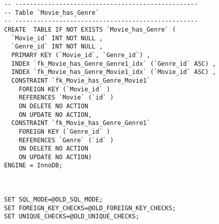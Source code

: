 \begin{lstlisting}[breaklines]
-- --------------------------------------------------
-- Table `Movie_has_Genre`
-- --------------------------------------------------
CREATE  TABLE IF NOT EXISTS `Movie_has_Genre` (
  `Movie_id` INT NOT NULL ,
  `Genre_id` INT NOT NULL ,
  PRIMARY KEY (`Movie_id`, `Genre_id`) ,
  INDEX `fk_Movie_has_Genre_Genre1_idx` (`Genre_id` ASC) ,
  INDEX `fk_Movie_has_Genre_Movie1_idx` (`Movie_id` ASC) ,
  CONSTRAINT `fk_Movie_has_Genre_Movie1`
    FOREIGN KEY (`Movie_id` )
    REFERENCES `Movie` (`id` )
    ON DELETE NO ACTION
    ON UPDATE NO ACTION,
  CONSTRAINT `fk_Movie_has_Genre_Genre1`
    FOREIGN KEY (`Genre_id` )
    REFERENCES `Genre` (`id` )
    ON DELETE NO ACTION
    ON UPDATE NO ACTION)
ENGINE = InnoDB;



SET SQL_MODE=@OLD_SQL_MODE;
SET FOREIGN_KEY_CHECKS=@OLD_FOREIGN_KEY_CHECKS;
SET UNIQUE_CHECKS=@OLD_UNIQUE_CHECKS;
\end{lstlisting}
\newpage